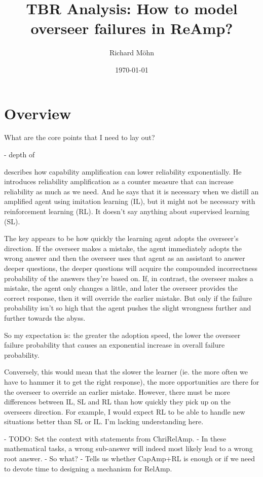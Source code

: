 \documentclass{farlamp}
\title{TBR Analysis: How to model overseer failures in ReAmp?}
\author{Richard Möhn}
\date{\today}
\begin{document}
\maketitle
\tableofcontents

\section{Overview}

What are the core points that I need to lay out?

- depth of 


\textcite{ChriRelAmp} describes how capability amplification can lower
reliability exponentially. He introduces reliability amplification as a counter
measure that can increase reliability as much as we need. And he says that it is
necessary when we distill an amplified agent using imitation learning (IL), but
it might not be necessary with reinforcement learning (RL). It doesn't say
anything about supervised learning (SL).

The key appears to be how quickly the learning agent adopts the overseer's
direction. If the overseer makes a mistake, the agent immediately adopts the
wrong answer and then the overseer uses that agent as an assistant to answer
deeper questions, the deeper questions will acquire the compounded incorrectness
probability of the answers they're based on. If, in contrast, the overseer makes
a mistake, the agent only changes a little, and later the overseer provides the
correct response, then it will override the earlier mistake. But only if the
failure probability isn't so high that the agent pushes the slight wrongness
further and further towards the abyss.

So my expectation is: the greater the adoption speed, the lower the overseer
failure probability that causes an exponential increase in overall failure
probability.

Conversely, this would mean that the slower the learner (ie. the more often we
have to hammer it to get the right response), the more opportunities are there
for the overseer to override an earlier mistake. However, there must be more
differences between IL, SL and RL than how quickly they pick up on the overseers
direction. For example, I would expect RL to be able to handle new situations
better than SL or IL. I'm lacking understanding here.

- TODO: Set the context with statements from ChriRelAmp.
- In these mathematical tasks, a wrong sub-answer will indeed most likely lead
to a wrong root answer.
- So what?
    - Tells us whether CapAmp+RL is enough or if we need to devote time to
    designing a mechanism for RelAmp.
\end{document}
